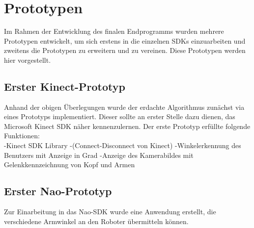 \section{Prototypen}
Im Rahmen der Entwicklung des finalen Endprogramms wurden mehrere Prototypen entwickelt, um sich erstens in die einzelnen SDKs einzuarbeiten und zweitens die Prototypen zu erweitern und zu vereinen. Diese Prototypen werden hier vorgestellt.

\subsection{Erster Kinect-Prototyp}
Anhand der obigen Überlegungen wurde der erdachte Algorithmus zunächst via eines Prototyps implementiert. Dieser sollte an erster Stelle dazu dienen, das Microsoft Kinect SDK näher kennenzulernen. Der erste Prototyp erfüllte folgende Funktionen:\\
-Kinect SDK Library
-(Connect-Disconnect von Kinect)
-Winkelerkennung des Benutzers mit Anzeige in Grad
-Anzeige des Kamerabildes mit Gelenkkennzeichnung von Kopf und Armen

\subsection{Erster Nao-Prototyp}
Zur Einarbeitung in das Nao-SDK wurde eine Anwendung erstellt, die verschiedene Armwinkel an den Roboter übermitteln können.

